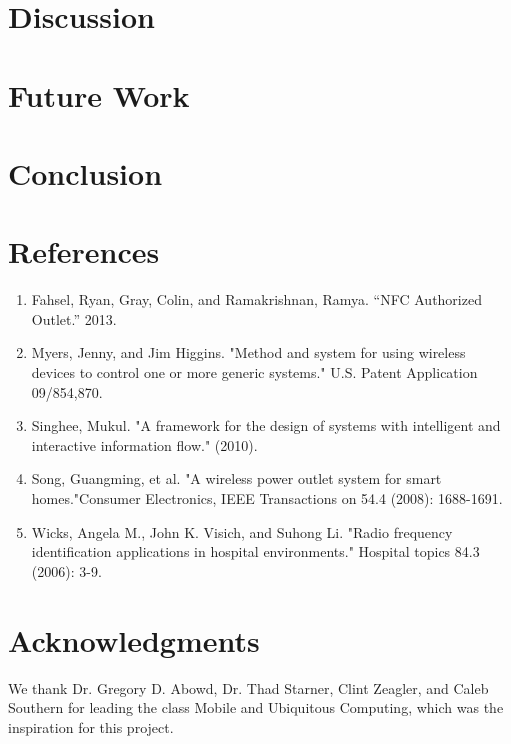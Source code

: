 \documentclass{sigchi}
\begin{document}
\section{Discussion}


\section{Future Work}


\section{Conclusion}


\section{References}
\begin{enumerate}
\item Fahsel, Ryan, Gray, Colin, and Ramakrishnan, Ramya. “NFC Authorized Outlet.” 2013.

\item Myers, Jenny, and Jim Higgins. "Method and system for using wireless devices to control one or more generic systems." U.S. Patent Application 09/854,870.

\item Singhee, Mukul. "A framework for the design of systems with intelligent and interactive information flow." (2010).

\item Song, Guangming, et al. "A wireless power outlet system for smart homes."Consumer Electronics, IEEE Transactions on 54.4 (2008): 1688-1691.

\item Wicks, Angela M., John K. Visich, and Suhong Li. "Radio frequency identification applications in hospital environments." Hospital topics 84.3 (2006): 3-9.
\end{enumerate}

\section{Acknowledgments}

We thank Dr. Gregory D. Abowd, Dr. Thad Starner, Clint Zeagler, and Caleb Southern for leading the class Mobile and Ubiquitous Computing, which was the inspiration for this project.

%
%
%
%
%
\balance

%
%
\end{document}
